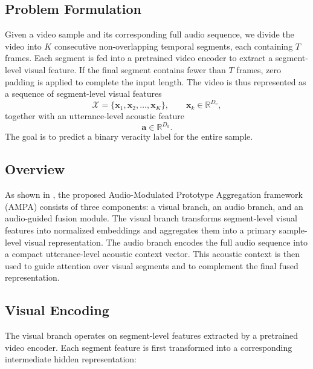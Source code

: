 \documentclass[sigconf,screen,review,anonymous]{acmart}
\begin{document}
\subsection{Problem Formulation}

Given a video sample and its corresponding full audio sequence, we divide the video into $K$ consecutive non-overlapping temporal segments, each containing $T$ frames. Each segment is fed into a pretrained video encoder to extract a segment-level visual feature. If the final segment contains fewer than  $T$ frames, zero padding is applied to complete the input length. The video is thus represented as a sequence of segment-level visual features
\begin{equation}
\mathcal{X}=\{\mathbf{x}_1,\mathbf{x}_2,\dots,\mathbf{x}_K\}, 
\qquad \mathbf{x}_k \in \mathbb{R}^{D_v},
\end{equation}
together with an utterance-level acoustic feature
\begin{equation}
\mathbf{a} \in \mathbb{R}^{D_a}.
\end{equation}
The goal is to predict a binary veracity label for the entire sample.



\subsection{Overview}

As shown in , the proposed Audio-Modulated Prototype Aggregation framework (AMPA) consists of three components: a visual branch, an audio branch, and an audio-guided fusion module. The visual branch transforms segment-level visual features into normalized embeddings and aggregates them into a primary sample-level visual representation. The audio branch encodes the full audio sequence into a compact utterance-level acoustic context vector. This acoustic context is then used to guide attention over visual segments and to complement the final fused representation.



\subsection{Visual Encoding}

The visual branch operates on segment-level features extracted by a pretrained video encoder. Each segment feature is first transformed into a corresponding intermediate hidden representation:
\end{document}
